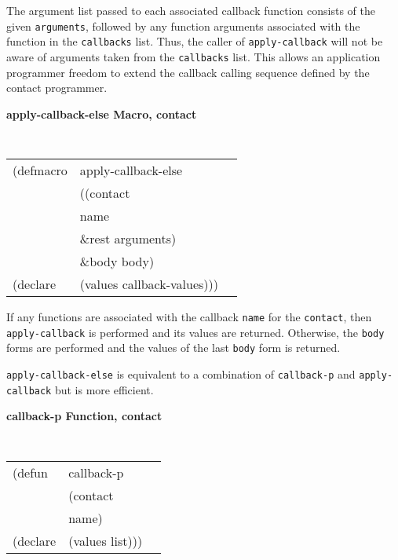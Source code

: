 \documentclass[twoside]{book}
\begin{document}
\begin{sloppy}
\begin{flushright}
\parbox[t]{6.125in}{ The argument list passed to each associated callback
function consists of the given {\tt arguments}, followed by any function
arguments associated with the function in the {\tt callbacks} list. Thus, the
caller of {\tt apply-callback} will not be aware of arguments taken from the
{\tt callbacks} list. This allows an application programmer freedom to extend
the callback calling sequence defined by the contact programmer. }
\end{flushright}

{\samepage
{\large {\bf apply-callback-else \hfill Macro, contact}} 

\begin{flushright} \parbox[t]{6.125in}{
\tt
\begin{tabular}{lll}
\raggedright
(defmacro & apply-callback-else & \\ 
& ((contact\\
&  name\\
& \&rest arguments)\\
& \&body body)\\        
(declare &(values callback-values)))
\end{tabular}
\rm

}\end{flushright}
}

\begin{flushright} 
\parbox[t]{6.125in}{
If any functions are associated with the callback
{\tt name} for the {\tt contact}, then {\tt apply-callback} is performed
and its values are returned. Otherwise, the {\tt body} forms are
performed and the values of the last {\tt body} form is returned.

{\tt apply-callback-else} is equivalent to a combination of
{\tt callback-p} and {\tt apply-callback} but is more efficient.}
\end{flushright}

{\samepage
{\large {\bf callback-p \hfill Function, contact}} 

\begin{flushright} \parbox[t]{6.125in}{
\tt
\begin{tabular}{lll}
\raggedright
(defun & callback-p & \\ 
& (contact\\
&  name)\\
(declare &(values list)))
\end{tabular}
\rm

}
\end{flushright}}
\end{sloppy}
\end{document}
